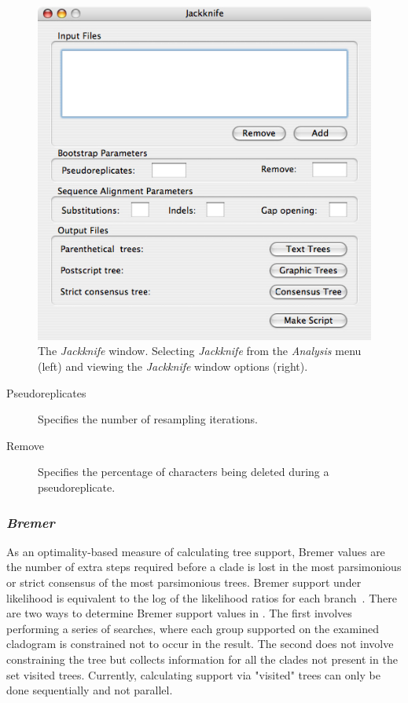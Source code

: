 {\begin{figure}
\begin{minipage}[c]{0.52\textwidth}
\includegraphics[width=\textwidth]{doc/figures/jackknife_window.jpg}
\end{minipage}
\caption{The \emph{Jackknife} window. Selecting \emph{Jackknife} from the \emph{Analysis} menu (left) and 
viewing the \emph{Jackknife} window options (right).}
\label{fig:jackknife}
\end{figure}

\begin{description}
\item[Pseudoreplicates] Specifies the number of resampling iterations.
\item[Remove] Specifies the percentage of characters being deleted during a pseudoreplicate.
\end{description}

\subsubsection*{\emph{Bremer}}

As an optimality-based measure of calculating tree support, Bremer values are the number of extra steps required before a clade is lost 
in the most parsimonious or strict consensus of the most parsimonious trees.  Bremer support under likelihood is equivalent 
to the log of the likelihood ratios for each branch~\cite{Wheeler2006}.  There are two ways to determine Bremer support values in \poy.  
The first involves performing a series of searches, where each group supported on the examined cladogram is constrained not to occur in 
the result.  The second does not involve constraining the tree but collects information for all the clades not present in the set visited trees.
Currently, calculating support via "visited" trees can only be done sequentially and not parallel.

}
